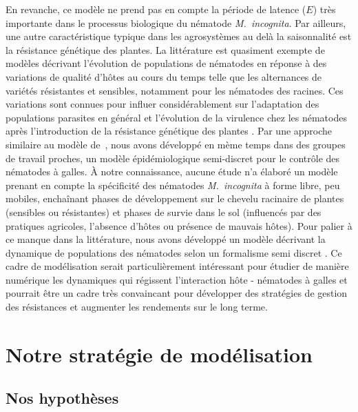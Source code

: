 	 En revanche, ce modèle ne prend pas en compte la période de latence ($E$) très importante dans le processus  biologique du nématode  \textit{M.~incognita}. Par ailleurs, une autre caractéristique typique
dans les agrosystèmes au delà la saisonnalité est la résistance génétique des plantes. La littérature est quasiment exempte de modèles décrivant l'évolution de populations de nématodes en réponse à des variations de qualité d'hôtes au cours du temps telle que les alternances de variétés résistantes et sensibles, notamment pour les nématodes des racines. Ces variations sont connues pour influer considérablement sur l'adaptation des populations parasites en général \citep{Crossan2007, McDonald2002, Zhan2015} et l'évolution de la virulence chez les nématodes après l'introduction de la résistance génétique des plantes  \citep{Castagnone-Sereno2002}. 
	Par une approche similaire au modèle de~\citet{Tankam-Chedjou2020},  nous avons développé en mème temps dans des groupes de travail proches, un modèle épidémiologique semi-discret pour le contrôle des nématodes à galles. À notre connaissance, aucune étude n'a élaboré un modèle prenant en compte la spécificité des nématodes  \textit{M.~incognita}  à forme libre, peu mobiles, enchaînant phases de
développement sur le chevelu racinaire de plantes (sensibles ou résistantes) et phases de survie dans le sol (influencés par des pratiques  agricoles, l'absence d'hôtes ou présence de mauvais hôtes).  Pour palier à ce manque dans la littérature, nous avons développé un modèle décrivant la dynamique de populations des nématodes selon un formalisme semi discret \citep{Madden2002, Mailleret2012}.  Ce cadre de modélisation serait particulièrement intéressant pour étudier de manière numérique  les dynamiques  qui régissent l'interaction hôte - nématodes à galles et pourrait être un cadre très convaincant pour développer des stratégies de gestion des résistances et augmenter les rendements sur le long terme.  
	
	
	 
	
\section{Notre stratégie de modélisation}\label{sec:notre-strategie}

\subsection{Nos hypothèses} \label{sec:nos-hypotheses}
	
